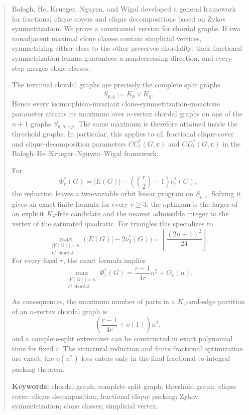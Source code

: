 \documentclass[11pt,a4paper]{article}
\begin{document}
\begin{abstract}
Balogh, He, Krueger, Nguyen, and Wigal developed a general framework for
fractional clique covers and clique decompositions based on Zykov
symmetrization. We prove a constrained version for chordal graphs. If two
nonadjacent maximal clone classes contain simplicial vertices, symmetrizing
either class to the other preserves chordality; their fractional
symmetrization lemma guarantees a nondecreasing direction, and every step
merges clone classes.

The terminal chordal graphs are precisely the complete split graphs
\[
S_{p,q}:=K_p\vee\overline K_q.
\]
Hence every isomorphism-invariant clone-symmetrization-monotone parameter
attains its maximum over \(n\)-vertex chordal graphs on one of the \(n+1\)
graphs \(S_{p,n-p}\). The same maximum is therefore attained inside the
threshold graphs. In particular, this applies to all fractional
clique-cover and clique-decomposition parameters \(CC_t^*(G,\mathbf c)\)
and \(CD_t^*(G,\mathbf c)\) in the Balogh--He--Krueger--Nguyen--Wigal
framework.

For
\[
\Phi_r^*(G)
=
|E(G)|-\left(\binom r2-1\right)\nu_r^*(G),
\]
the reduction leaves a two-variable orbit linear program on \(S_{p,q}\).
Solving it gives an exact finite formula for every \(r\ge3\): the optimum is
the larger of an explicit \(K_r\)-free candidate and the nearest admissible
integer to the vertex of the saturated quadratic. For triangles this
specializes to
\[
\max_{\substack{|V(G)|=n\\G\text{ chordal}}}
\bigl(|E(G)|-2\nu_3^*(G)\bigr)
=
\left\lfloor\frac{(2n+1)^2}{24}\right\rfloor.
\]
For every fixed \(r\), the exact formula implies
\[
\max_{\substack{|V(G)|=n\\G\text{ chordal}}}\Phi_r^*(G)
=
\frac{r-1}{4r}n^2+O_r(n).
\]

As consequences, the maximum number of parts in a \(K_r\)-and-edge
partition of an \(n\)-vertex chordal graph is
\[
\left(\frac{r-1}{4r}+o(1)\right)n^2,
\]
and a complete-split extremizer can be constructed in exact polynomial
time for fixed \(r\). The structural reduction and finite fractional
optimization are exact; the \(o(n^2)\) loss enters only in the final
fractional-to-integral packing theorem.

\medskip
\noindent\textbf{Keywords:} chordal graph; complete split graph; threshold graph; clique
cover; clique decomposition; fractional clique packing; Zykov
symmetrization; clone classes; simplicial vertex.
\end{abstract}
\vspace{0.8em}
\end{document}
